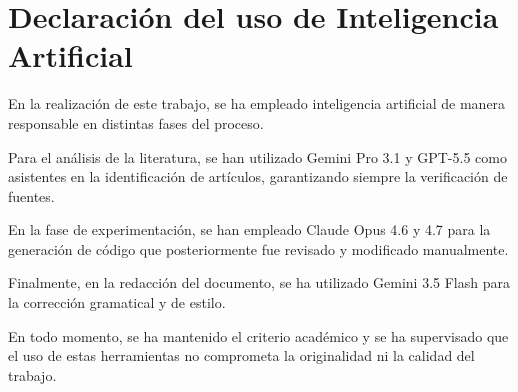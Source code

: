 \cleardoublepage

{}
\chapter*{Declaración del uso de Inteligencia Artificial}
\label{declaracion-uso-ia}

En la realización de este trabajo, se ha empleado inteligencia artificial de manera
responsable en distintas fases del proceso.

Para el análisis de la literatura, se han utilizado Gemini Pro 3.1 y GPT-5.5 como asistentes en la identificación de artículos, garantizando siempre la
verificación de fuentes.

En la fase de experimentación, se han empleado Claude Opus 4.6 y 4.7
para la generación de código que posteriormente fue revisado y modificado
manualmente.

Finalmente, en la redacción del documento, se ha utilizado Gemini 3.5 Flash para la corrección gramatical y de estilo.

En todo momento, se ha mantenido el criterio académico y se ha supervisado que el uso de
estas herramientas no comprometa la originalidad ni la calidad del trabajo.
